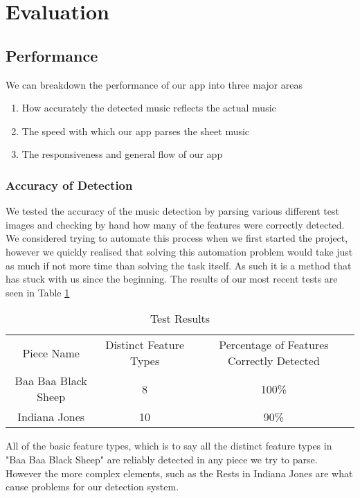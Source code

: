 \section{Evaluation}
    
    \subsection{Performance}
    We can breakdown the performance of our app into three major areas
        \begin{enumerate}
        \item{How accurately the detected music reflects the actual music}
        \item{The speed with which our app parses the sheet music}
        \item{The responsiveness and general flow of our app}
        \end{enumerate}
        \subsubsection{Accuracy of Detection}
            We tested the accuracy of the music detection by parsing various different test images and checking by hand how many of the features were correctly detected. We considered trying to automate this process when we first started the project, however we quickly realised that solving this automation problem would take just as much if not more time than solving the task itself. As such it is a method that has stuck with us since the beginning.
            The results of our most recent tests are seen in Table \ref{table:testresults}
            \begin{table}[h!]
                \centering
                \begin{tabular}{ c | c | c }
                    Piece Name & Distinct Feature Types & Percentage of Features Correctly Detected \\
                    Baa Baa Black Sheep & 8 & 100\% \\
                    Indiana Jones & 10 & 90\%\\
                \end{tabular}
                \caption{Test Results}
                \label{table:testresults}
            \end{table}
            
            All of the basic feature types, which is to say all the distinct feature types in "Baa Baa Black Sheep" are reliably detected in any piece we try to parse. However the more complex elements, such as the Rests in Indiana Jones are what cause problems for our detection system.
